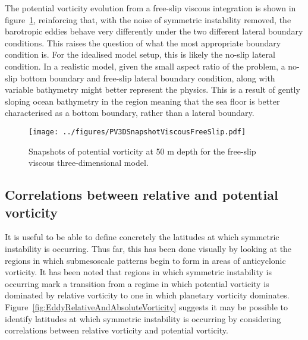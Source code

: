 The potential vorticity evolution from a free-slip viscous integration is shown in figure~\ref{fig:PV3DSnapshotViscousFreeSlip}, reinforcing that, with the noise of symmetric instability removed, the barotropic eddies behave very differently under the two different lateral boundary conditions. This raises the question of what the most appropriate boundary condition is. For the idealised model setup, this is likely the no-slip lateral condition. In a realistic model, given the small aspect ratio of the problem, a no-slip bottom boundary and free-slip lateral boundary condition, along with variable bathymetry might better represent the physics. This is a result of gently sloping ocean bathymetry in the region meaning that the sea floor is better characterised as a bottom boundary, rather than a lateral boundary.

\begin{figure}[p]
    \centering
    \texttt{[image: ../figures/PV3DSnapshotViscousFreeSlip.pdf]}
    \caption{Snapshots of potential vorticity at 50 m depth for the free-slip viscous three-dimensional model.}
    \label{fig:PV3DSnapshotViscousFreeSlip}
\end{figure}

\subsection{Correlations between relative and potential vorticity}
It is useful to be able to define concretely the latitudes at which symmetric instability is occurring. Thus far, this has been done visually by looking at the regions in which submesoscale patterns begin to form in areas of anticyclonic vorticity. It has been noted that regions in which symmetric instability is occurring mark a transition from a regime in which potential vorticity is dominated by relative vorticity to one in which planetary vorticity dominates. Figure~\ref{fig:EddyRelativeAndAbsoluteVorticity} suggests it may be possible to identify latitudes at which symmetric instability is occurring by considering correlations between relative vorticity and potential vorticity.

